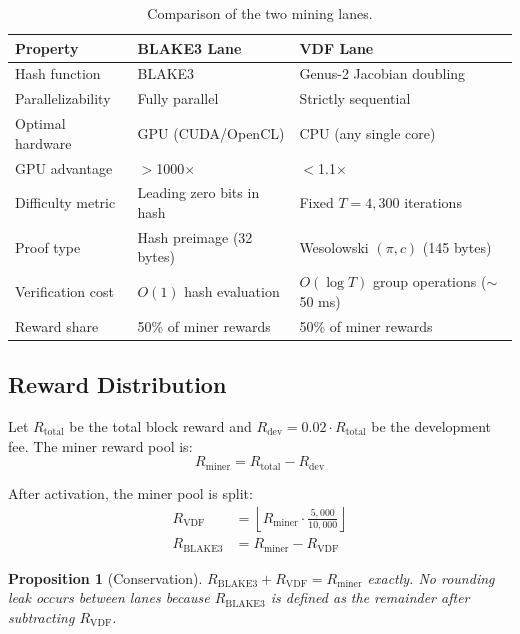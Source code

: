 \documentclass[11pt,a4paper]{article}
\newtheorem{proposition}[theorem]{Proposition}
\begin{document}
\begin{table}[h]
\centering
\begin{tabular}{lll}
\toprule
\textbf{Property} & \textbf{BLAKE3 Lane} & \textbf{VDF Lane} \\
\midrule
Hash function & BLAKE3 & Genus-2 Jacobian doubling \\
Parallelizability & Fully parallel & Strictly sequential \\
Optimal hardware & GPU (CUDA/OpenCL) & CPU (any single core) \\
GPU advantage & $>$1000$\times$ & $<$1.1$\times$ \\
Difficulty metric & Leading zero bits in hash & Fixed $T = 4{,}300$ iterations \\
Proof type & Hash preimage (32 bytes) & Wesolowski $(\pi, c)$ (145 bytes) \\
Verification cost & $O(1)$ hash evaluation & $O(\log T)$ group operations ($\sim$50 ms) \\
Reward share & 50\% of miner rewards & 50\% of miner rewards \\
\bottomrule
\end{tabular}
\caption{Comparison of the two mining lanes.}
\label{tab:lanes}
\end{table}

\subsection{Reward Distribution}

Let $R_{\mathrm{total}}$ be the total block reward and $R_{\mathrm{dev}} = 0.02 \cdot R_{\mathrm{total}}$ be the development fee. The miner reward pool is:
\begin{equation}
    R_{\mathrm{miner}} = R_{\mathrm{total}} - R_{\mathrm{dev}}
\end{equation}

After activation, the miner pool is split:
\begin{align}
    R_{\mathrm{VDF}} &= \left\lfloor R_{\mathrm{miner}} \cdot \frac{5{,}000}{10{,}000} \right\rfloor \\
    R_{\mathrm{BLAKE3}} &= R_{\mathrm{miner}} - R_{\mathrm{VDF}}
\end{align}

\begin{proposition}[Conservation]
$R_{\mathrm{BLAKE3}} + R_{\mathrm{VDF}} = R_{\mathrm{miner}}$ exactly. No rounding leak occurs between lanes because $R_{\mathrm{BLAKE3}}$ is defined as the remainder after subtracting $R_{\mathrm{VDF}}$.
\end{proposition}
\end{document}
